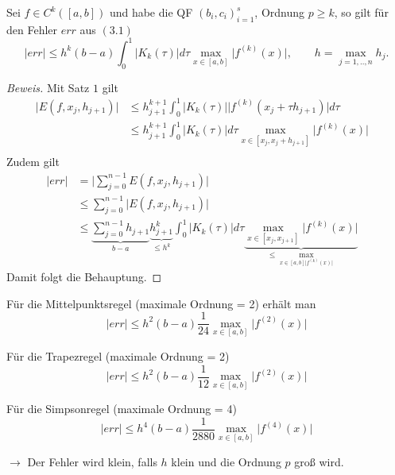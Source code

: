 \begin{nothing}
\begin{description}
    \item[Satz 3:] 
      Sei $f \in C^k([a,b])$ und habe die QF $(b_i, c_i)^s_{i=1}$, Ordnung $p \geq k$, so gilt für den Fehler $err$ aus $(3.1)$ 
      $$ \vert err \vert \leq h^k (b-a) \int_0^1 \vert K_k(\tau) \vert d\tau \max_{x \in [a,b]} \vert f^{(k)}(x) \vert, \quad \quad h = \max_{j=1,..,n} h_j.$$
    
    \item \begin{proof}[Beweis]
      Mit Satz $1$ gilt 
      \begin{align*}
      \vert E(f, x_j, h_{j+1}) \vert &\leq h_{j+1}^{k+1} \int_0^1 \vert K_k(\tau) \vert \vert f^{(k)}(x_j+\tau h_{j+1}) \vert d\tau&\\
      &\leq h_{j+1}^{k+1} \int_0^1 \vert K_k(\tau) \vert d\tau \max_{x \in [x_j, x_j + h_{j+1}]} \vert f^{(k)}(x) \vert&\\
      \end{align*}
      Zudem gilt 
      \begin{align*} 
      \vert err \vert &= \vert \sum_{j=0}^{n-1} E(f, x_j, h_{j+1}) \vert &\\
      &\leq \sum_{j=0}^{n-1} \vert E(f, x_j, h_{j+1}) \vert &\\
      &\leq \underbrace{\sum_{j=0}^{n-1} h_{j+1}}_{b-a} \underbrace{h_{j+1}^k}_{\leq h^k} \int_0^1 \vert K_k(\tau) \vert d\tau \underbrace{\max_{x \in [x_j, x_{j+1}]} \vert f^{(k)} (x) \vert}_{\leq \max_{x\in[a,b] \vert f^{(k)}(x) \vert}}
      \end{align*}
      Damit folgt die Behauptung.
    \end{proof}
    
    \item[Beispiele]
      \begin{description}\item\end{description}
      \begin{description}
        \item Für die Mittelpunktsregel (maximale Ordnung = 2) erhält man
      		$$ \vert err \vert \leq h^2 (b-a) \frac{1}{24} \max_{x\in[a,b]} \vert f^{(2)}(x) \vert $$ 
      	\item Für die Trapezregel (maximale Ordnung = 2)
      		$$ \vert err \vert \leq h^2 (b-a) \frac{1}{12} \max_{x\in[a,b]} \vert f^{(2)}(x) \vert $$  
      	\item Für die Simpsonregel (maximale Ordnung = 4)
      		$$ \vert err \vert \leq h^4 (b-a) \frac{1}{2880} \max_{x\in[a,b]} \vert f^{(4)}(x) \vert $$ 
	  \end{description}
      $\rightarrow$ Der Fehler wird klein, falls $h$ klein und die Ordnung $p$ groß wird.
\end{description}
\end{nothing}